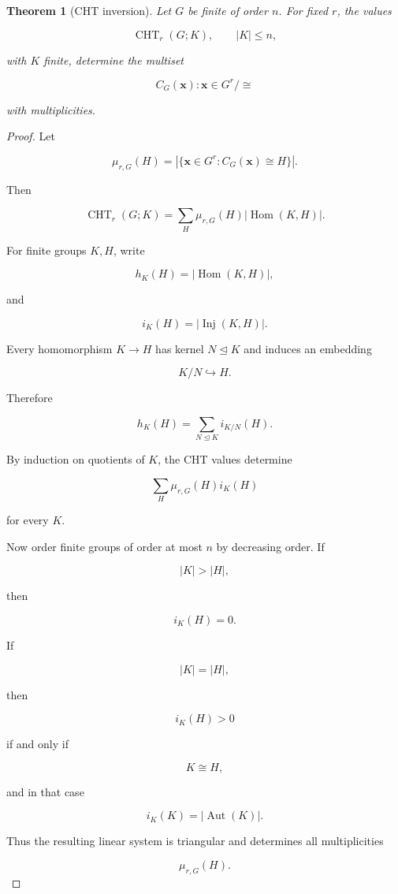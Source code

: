 \documentclass[11pt]{article}
\newtheorem{theorem}{Theorem}[section]
\begin{document}
\begin{theorem}[CHT inversion]

Let $G$ be finite of order $n$. For fixed $r$, the values

\[
\operatorname{CHT}_r(G;K),
\qquad |K|\le n,
\]

with $K$ finite, determine the multiset

\[
{C_G(\mathbf x):\mathbf x\in G^r}/\cong
\]

with multiplicities.

\end{theorem}
\begin{proof}

Let

\[
\mu_{r,G}(H)
=|\{\mathbf x\in G^r:C_G(\mathbf x)\cong H\}|.
\]

Then

\[
\operatorname{CHT}_r(G;K)=
\sum_H
\mu_{r,G}(H)|\operatorname{Hom}(K,H)|.
\]

For finite groups $K,H$, write

\[
h_K(H)=|\operatorname{Hom}(K,H)|,
\]

and

\[
i_K(H)=|\operatorname{Inj}(K,H)|.
\]

Every homomorphism $K\to H$ has kernel $N\trianglelefteq K$ and induces an embedding

\[
K/N\hookrightarrow H.
\]

Therefore

\[
h_K(H)=
\sum_{N\trianglelefteq K}
i_{K/N}(H).
\]

By induction on quotients of $K$, the CHT values determine

\[
\sum_H \mu_{r,G}(H)i_K(H)
\]

for every $K$.

Now order finite groups of order at most $n$ by decreasing order. If

\[
|K|>|H|,
\]

then

\[
i_K(H)=0.
\]

If

\[
|K|=|H|,
\]

then

\[
i_K(H)>0
\]

if and only if

\[
K\cong H,
\]

and in that case

\[
i_K(K)=|\operatorname{Aut}(K)|.
\]

Thus the resulting linear system is triangular and determines all multiplicities

\[
\mu_{r,G}(H).
\]

\end{proof}
\end{document}
